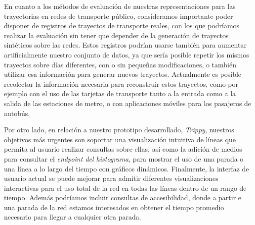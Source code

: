     \medskip
    En cuanto a los m\'etodos de evaluaci\'on de nuestras representaciones para las trayectorias en redes de transporte p\'ublico, consideramos importante poder disponer de registros de trayectos de transporte reales, con los que podr\'iamos realizar la evaluaci\'on sin tener que depender de la generaci\'on de trayectos sint\'eticos sobre las redes. Estos registros podr\'ian usarse tambi\'en para aumentar artificialmente nuestro conjunto de datos, ya que ser\'ia posible repetir los mismos trayectos sobre d\'ias diferentes, con o sin peque\~nas modificaciones, o tambi\'en utilizar esa informaci\'on para generar nuevos trayectos. Actualmente es posible recolectar la informaci\'on necesaria para reconstruir estos trayectos, como por ejemplo con el uso de las tarjetas de transporte tanto a la entrada como a la salida de las estaciones de metro, o con aplicaciones m\'oviles para los pasajeros de autob\'us.
    
    \medskip
    Por otro lado, en relaci\'on a nuestro prototipo desarrollado, {\em Trippy}, nuestros objetivos m\'as urgentes son soportar una visualizaci\'on intuitiva de l\'ineas que permita al usuario realizar consultas sobre ellas, as\'i como la adici\'on de medios para consultar el \textit{endpoint del histograma}, para mostrar el uso de una parada o una l\'inea a lo largo del tiempo con gr\'aficos din\'amicos. Finalmente, la interfaz de usuario actual se puede mejorar para admitir diferentes visualizaciones interactivas para el uso total de la red en todas las l\'ineas dentro de un rango de tiempo. Adem\'as podr\'iamos incluir consultas de accesibilidad, donde a partir e una parada de la red estamos interesados en obtener el tiempo promedio necesario para llegar a cualquier otra parada.